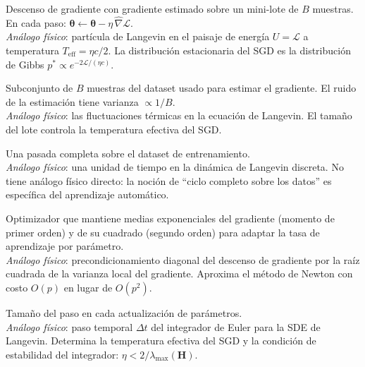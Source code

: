 \begin{description}[leftmargin=0pt, labelwidth=!, labelsep=1em,
  font=\normalfont\bfseries, style=nextline]

\item[SGD --- \textit{Stochastic Gradient Descent}]
Descenso de gradiente con gradiente estimado sobre un mini-lote de $B$
muestras. En cada paso: $\bm{\theta} \leftarrow \bm{\theta} - \eta\,
\hat{\nabla}\mathcal{L}$.\\
\emph{Análogo físico}: partícula de Langevin en el paisaje de energía
$U = \mathcal{L}$ a temperatura $T_{\mathrm{eff}} = \eta c/2$. La distribución
estacionaria del SGD es la distribución de Gibbs
$p^*\propto e^{-2\mathcal{L}/(\eta c)}$.

\item[Mini-lote (\textit{mini-batch})]
Subconjunto de $B$ muestras del dataset usado para estimar el gradiente.
El ruido de la estimación tiene varianza $\propto 1/B$.\\
\emph{Análogo físico}: las fluctuaciones térmicas en la ecuación de Langevin.
El tamaño del lote controla la temperatura efectiva del SGD.

\item[Época (\textit{epoch})]
Una pasada completa sobre el dataset de entrenamiento.\\
\emph{Análogo físico}: una unidad de tiempo en la dinámica de Langevin
discreta. No tiene análogo físico directo: la noción de ``ciclo completo
sobre los datos'' es específica del aprendizaje automático.

\item[Adam --- \textit{Adaptive Moment Estimation}]
Optimizador que mantiene medias exponenciales del gradiente (momento de
primer orden) y de su cuadrado (segundo orden) para adaptar la tasa de
aprendizaje por parámetro.\\
\emph{Análogo físico}: precondicionamiento diagonal del descenso de gradiente
por la raíz cuadrada de la varianza local del gradiente. Aproxima el método
de Newton con costo $O(p)$ en lugar de $O(p^2)$.

\item[Tasa de aprendizaje (\textit{learning rate}) $\eta$]
Tamaño del paso en cada actualización de parámetros.\\
\emph{Análogo físico}: paso temporal $\Delta t$ del integrador de Euler
para la SDE de Langevin. Determina la temperatura efectiva del SGD y la
condición de estabilidad del integrador: $\eta < 2/\lambda_{\max}(\bm{H})$.


\end{description}
